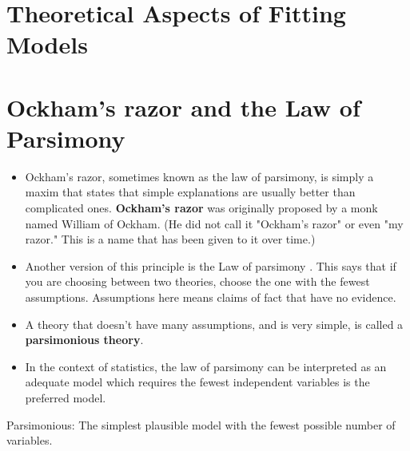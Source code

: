 \docume



\section*{Theoretical Aspects of Fitting Models}

\section*{Ockham's razor and the Law of Parsimony}
\begin{itemize}
	\item Ockham's razor, sometimes known as the law of parsimony, is simply a maxim that states that simple explanations are usually better than complicated ones. \textbf{Ockham's razor} was originally proposed by a monk named William of Ockham. (He did not call it "Ockham's razor" or even "my razor." This is a name that has been given to it over time.)
	
\item Another version of this principle is the Law of parsimony . This says that if you are choosing between two theories, choose the one with the fewest assumptions. Assumptions here means claims of fact that have no evidence.
\item A theory that doesn't have many assumptions, and is very simple, is called a \textbf{parsimonious theory}.
	
\item In the context of statistics, the law of parsimony can be interpreted as an adequate model which requires the fewest independent variables is the preferred model.
\end{itemize}

\begin{framed}
	Parsimonious: The simplest plausible model with the fewest possible number of variables.
\end{framed}




